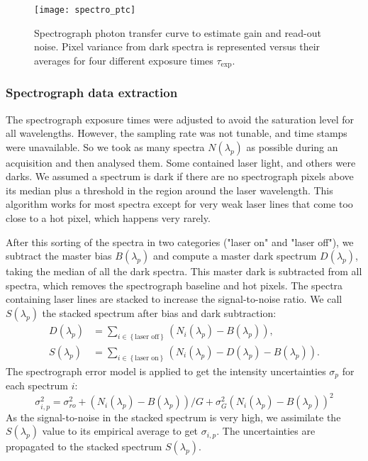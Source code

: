 \begin{figure}[!h]
\centering
\texttt{[image: spectro\_ptc]}
\caption{Spectrograph photon transfer curve to estimate gain and read-out noise. Pixel variance from dark spectra is represented versus their averages for four different exposure times $\tau_{\mathrm{exp}}$.}\label{fig:spectro_ptc}
\end{figure}


\subsubsection{Spectrograph data extraction}


The spectrograph exposure times were adjusted to avoid the saturation level for all wavelengths. However, the sampling rate was not tunable, and time stamps were unavailable. So we took as many spectra $N(\lambda_p)$ as possible during an acquisition and then analysed them. Some contained laser light, and others were darks. We assumed a spectrum is dark if there are no spectrograph pixels above its median plus a threshold in the region around the laser wavelength. This algorithm works for most spectra except for very weak laser lines that come too close to a hot pixel, which happens very rarely.

After this sorting of the spectra in two categories ("laser on" and "laser off"), we subtract the master bias $B(\lambda_p)$ and compute a master dark spectrum $D(\lambda_p)$, taking the median of all the dark spectra. This master dark is subtracted from all spectra, which removes the spectrograph baseline and hot pixels. The spectra containing laser lines are stacked to increase the signal-to-noise ratio. We call $S(\lambda_p)$ the stacked spectrum after bias and dark subtraction:
\begin{align}
D(\lambda_p) & = \sum_{i \in \left\lbrace \text{laser off}\right\rbrace}\left( N_i(\lambda_p) - B(\lambda_p)\right), \\
    S(\lambda_p) & = \sum_{i \in \left\lbrace \text{laser on}\right\rbrace}\left( N_i(\lambda_p) - D(\lambda_p) - B(\lambda_p)\right).
\end{align}
The spectrograph error model is applied to get the intensity uncertainties $\sigma_p$ for each spectrum $i$:
\begin{equation}\label{eq:spectro_error_model_data}
\sigma^2_{i,p} =\sigma_{ro}^2 +  (N_i(\lambda_p) - B(\lambda_p))/G + \sigma_G^2 (N_i(\lambda_p) - B(\lambda_p))^2
\end{equation}
As the signal-to-noise in the stacked spectrum is very high, we assimilate the $S(\lambda_p)$ value to its empirical average to get $\sigma_{i,p}$. The uncertainties are propagated to the stacked spectrum $S(\lambda_p)$.

